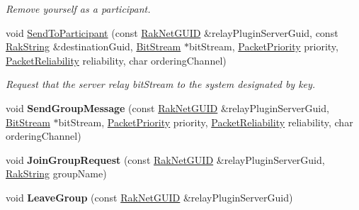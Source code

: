 \begin{DoxyCompactItemize}
\begin{DoxyCompactList}\small\item\em Remove yourself as a participant. \end{DoxyCompactList}\item 
void \hyperlink{class_rak_net_1_1_relay_plugin_a87ccee7236bc47e58d6b44998a10221d}{Send\-To\-Participant} (const \hyperlink{struct_rak_net_1_1_rak_net_g_u_i_d}{Rak\-Net\-G\-U\-I\-D} \&relay\-Plugin\-Server\-Guid, const \hyperlink{class_rak_net_1_1_rak_string}{Rak\-String} \&destination\-Guid, \hyperlink{class_rak_net_1_1_bit_stream}{Bit\-Stream} $\ast$bit\-Stream, \hyperlink{_packet_priority_8h_a659378374e516180f93640c79f59705c}{Packet\-Priority} priority, \hyperlink{_packet_priority_8h_ae41fa01235e99dced384d137fa874a7e}{Packet\-Reliability} reliability, char ordering\-Channel)
\begin{DoxyCompactList}\small\item\em Request that the server relay {\itshape bit\-Stream} to the system designated by {\itshape key}. \end{DoxyCompactList}\item 
\hypertarget{class_rak_net_1_1_relay_plugin_ae984b030db73eaf406bce1b0986bf970}{void {\bfseries Send\-Group\-Message} (const \hyperlink{struct_rak_net_1_1_rak_net_g_u_i_d}{Rak\-Net\-G\-U\-I\-D} \&relay\-Plugin\-Server\-Guid, \hyperlink{class_rak_net_1_1_bit_stream}{Bit\-Stream} $\ast$bit\-Stream, \hyperlink{_packet_priority_8h_a659378374e516180f93640c79f59705c}{Packet\-Priority} priority, \hyperlink{_packet_priority_8h_ae41fa01235e99dced384d137fa874a7e}{Packet\-Reliability} reliability, char ordering\-Channel)}\label{class_rak_net_1_1_relay_plugin_ae984b030db73eaf406bce1b0986bf970}

\item 
\hypertarget{class_rak_net_1_1_relay_plugin_a5d4af4c06640641ed8e2826bbd916987}{void {\bfseries Join\-Group\-Request} (const \hyperlink{struct_rak_net_1_1_rak_net_g_u_i_d}{Rak\-Net\-G\-U\-I\-D} \&relay\-Plugin\-Server\-Guid, \hyperlink{class_rak_net_1_1_rak_string}{Rak\-String} group\-Name)}\label{class_rak_net_1_1_relay_plugin_a5d4af4c06640641ed8e2826bbd916987}

\item 
\hypertarget{class_rak_net_1_1_relay_plugin_ac0c6804a063ba76b44e0c143e1cb2f60}{void {\bfseries Leave\-Group} (const \hyperlink{struct_rak_net_1_1_rak_net_g_u_i_d}{Rak\-Net\-G\-U\-I\-D} \&relay\-Plugin\-Server\-Guid)}\label{class_rak_net_1_1_relay_plugin_ac0c6804a063ba76b44e0c143e1cb2f60}


\end{DoxyCompactItemize}
